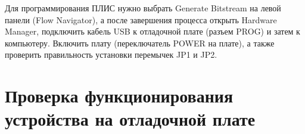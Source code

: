 \begin{sloppypar}
Для программирования ПЛИС нужно выбрать Generate Bitstream на левой панели (Flow Navigator), а после завершения процесса открыть Hardware Manager, подключить кабель USB к отладочной плате (разъем PROG) и затем к компьютеру. Включить плату (переключатель POWER на плате), а также проверить правильность установки перемычек JP1 и JP2. 


\section{Проверка функционирования устройства на отладочной плате} %









\end{sloppypar}
